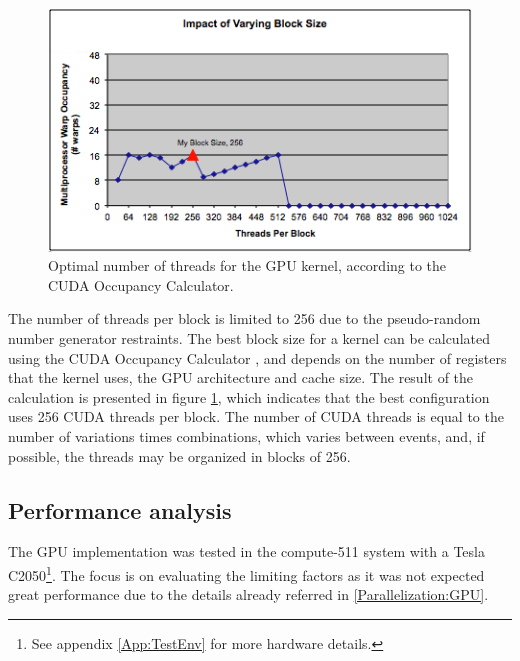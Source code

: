 \begin{figure}[!htp]
	\begin{center}
		\includegraphics[scale=0.6]{../../common/graphs/block_size_gpu.png}
		\caption{Optimal number of threads for the GPU kernel, according to the \nvidia CUDA Occupancy Calculator.}
		\label{fig:GPUCalc}
	\end{center}
\end{figure}

The number of threads per block is limited to 256 due to the pseudo-random number generator restraints. The best block size for a kernel can be calculated using the \nvidia CUDA Occupancy Calculator \cite{NVIDIA:Calculator}, and depends on the number of registers that the kernel uses, the GPU architecture and cache size. The result of the calculation is presented in figure \ref{fig:GPUCalc}, which indicates that the best configuration uses 256 CUDA threads per block. The number of CUDA threads is equal to the number of variations times combinations, which varies between events, and, if possible, the threads may be organized in blocks of 256.

\subsection{Performance analysis}
\label{GPUPerformance}

The GPU implementation was tested in the compute-511 system with a \nvidia Tesla C2050\footnote{See appendix \ref{App:TestEnv} for more hardware details.}. The focus is on evaluating the limiting factors as it was not expected great performance due to the details already referred in \ref{Parallelization:GPU}.

